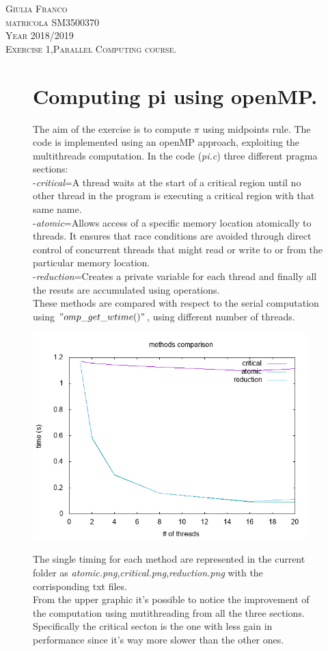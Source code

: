 \documentclass[12pt,a4paper,titlepage,twoside]{book}
\begin{document}
	\begin{flushleft}
		\large
		\textsc{Giulia Franco} \\
		\textsc{matricola SM3500370}\\
		\textsc{Year 2018/2019}
		\\
		\textsc{Exercise 1,Parallel Computing course.}
	\end{flushleft}
\newpage
\begin{figure}
	\section*{Computing pi using openMP.}
	The aim of the exercise is to compute $\pi$ using midpoints rule. The code is implemented using an openMP approach, exploiting the multithreads computation. In the code (\textit{pi.c}) three different pragma sections:\\
	-\textit{critical}=A thread waits at the start of a critical region until no other thread in the program is executing a critical region with that same name.\\
	-\textit{atomic}=Allows access of a specific memory location atomically to threads. It ensures that race conditions are avoided through direct control of concurrent threads that might read or write to or from the particular memory location.\\
	-\textit{reduction}=Creates a private variable for each thread and finally all the resuts are accumulated using operations.
	\\
	These methods are compared with respect to the serial computation using $"omp\_get\_wtime()"$, using different number of threads.
	\begin{center}
		\includegraphics[height=80mm, ]{comparison}
	\end{center}
    The single timing for each method are represented in the current folder as \textit{atomic.png},\textit{critical.png},\textit{reduction.png} with the corrisponding txt files.\\
    From the upper graphic it's possible to notice the improvement of the computation using mutithreading from all the three sections. Specifically the critical secton is the one with less gain in performance since it's way more slower than the other ones.
\end{figure}
\end{document}
